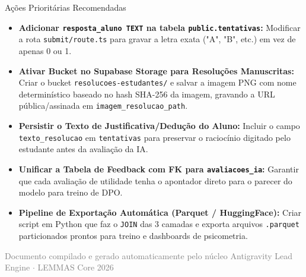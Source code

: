 \documentclass[11pt,a4paper]{article}
\begin{document}
\begin{acaoBox}{Ações Prioritárias Recomendadas}
\begin{itemize}[leftmargin=*]
    \item[\textbf{P0:}] \textbf{Adicionar \texttt{resposta\_aluno TEXT} na tabela \texttt{public.tentativas}:} Modificar a rota \texttt{submit/route.ts} para gravar a letra exata ("A", "B", etc.) em vez de apenas 0 ou 1.
    \item[\textbf{P0:}] \textbf{Ativar Bucket no Supabase Storage para Resoluções Manuscritas:} Criar o bucket \texttt{resolucoes-estudantes/} e salvar a imagem PNG com nome determinístico baseado no hash SHA-256 da imagem, gravando a URL pública/assinada em \texttt{imagem\_resolucao\_path}.
    \item[\textbf{P1:}] \textbf{Persistir o Texto de Justificativa/Dedução do Aluno:} Incluir o campo \texttt{texto\_resolucao} em \texttt{tentativas} para preservar o raciocínio digitado pelo estudante antes da avaliação da IA.
    \item[\textbf{P1:}] \textbf{Unificar a Tabela de Feedback com FK para \texttt{avaliacoes\_ia}:} Garantir que cada avaliação de utilidade tenha o apontador direto para o parecer do modelo para treino de DPO.
    \item[\textbf{P2:}] \textbf{Pipeline de Exportação Automática (Parquet / HuggingFace):} Criar script em Python que faz o \texttt{JOIN} das 3 camadas e exporta arquivos \texttt{.parquet} particionados prontos para treino e dashboards de psicometria.
\end{itemize}
\end{acaoBox}

\vspace{0.4cm}
\begin{center}
    \small\textcolor{gray}{Documento compilado e gerado automaticamente pelo núcleo Antigravity Lead Engine $\cdot$ LEMMAS Core 2026}
\end{center}
\end{document}
